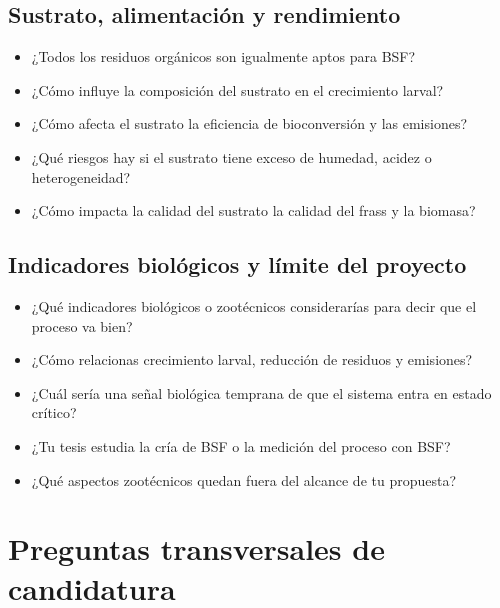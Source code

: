 \documentclass[11pt]{article}
\begin{document}
\subsection*{Sustrato, alimentación y rendimiento}
\begin{itemize}[leftmargin=*]
    \item ¿Todos los residuos orgánicos son igualmente aptos para BSF?
    \item ¿Cómo influye la composición del sustrato en el crecimiento larval?
    \item ¿Cómo afecta el sustrato la eficiencia de bioconversión y las emisiones?
    \item ¿Qué riesgos hay si el sustrato tiene exceso de humedad, acidez o heterogeneidad?
    \item ¿Cómo impacta la calidad del sustrato la calidad del frass y la biomasa?
\end{itemize}

\subsection*{Indicadores biológicos y límite del proyecto}
\begin{itemize}[leftmargin=*]
    \item ¿Qué indicadores biológicos o zootécnicos considerarías para decir que el proceso va bien?
    \item ¿Cómo relacionas crecimiento larval, reducción de residuos y emisiones?
    \item ¿Cuál sería una señal biológica temprana de que el sistema entra en estado crítico?
    \item ¿Tu tesis estudia la cría de BSF o la medición del proceso con BSF?
    \item ¿Qué aspectos zootécnicos quedan fuera del alcance de tu propuesta?
\end{itemize}

\section{Preguntas transversales de candidatura}
\end{document}

